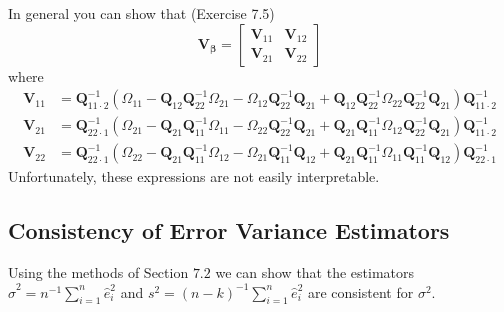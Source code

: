 \documentclass[10pt]{article}
\begin{document}
In general you can show that (Exercise 7.5)
$$
\boldsymbol{V}_{\boldsymbol{\beta}}=\left[\begin{array}{ll}
\boldsymbol{V}_{11} & \boldsymbol{V}_{12} \\
\boldsymbol{V}_{21} & \boldsymbol{V}_{22}
\end{array}\right]
$$
where
$$
\begin{aligned}
\boldsymbol{V}_{11} &=\boldsymbol{Q}_{11 \cdot 2}^{-1}\left(\Omega_{11}-\boldsymbol{Q}_{12} \boldsymbol{Q}_{22}^{-1} \Omega_{21}-\Omega_{12} \boldsymbol{Q}_{22}^{-1} \boldsymbol{Q}_{21}+\boldsymbol{Q}_{12} \boldsymbol{Q}_{22}^{-1} \Omega_{22} \boldsymbol{Q}_{22}^{-1} \boldsymbol{Q}_{21}\right) \boldsymbol{Q}_{11 \cdot 2}^{-1} \\
\boldsymbol{V}_{21} &=\boldsymbol{Q}_{22 \cdot 1}^{-1}\left(\Omega_{21}-\boldsymbol{Q}_{21} \boldsymbol{Q}_{11}^{-1} \Omega_{11}-\Omega_{22} \boldsymbol{Q}_{22}^{-1} \boldsymbol{Q}_{21}+\boldsymbol{Q}_{21} \boldsymbol{Q}_{11}^{-1} \Omega_{12} \boldsymbol{Q}_{22}^{-1} \boldsymbol{Q}_{21}\right) \boldsymbol{Q}_{11 \cdot 2}^{-1} \\
\boldsymbol{V}_{22} &=\boldsymbol{Q}_{22 \cdot 1}^{-1}\left(\Omega_{22}-\boldsymbol{Q}_{21} \boldsymbol{Q}_{11}^{-1} \Omega_{12}-\Omega_{21} \boldsymbol{Q}_{11}^{-1} \boldsymbol{Q}_{12}+\boldsymbol{Q}_{21} \boldsymbol{Q}_{11}^{-1} \Omega_{11} \boldsymbol{Q}_{11}^{-1} \boldsymbol{Q}_{12}\right) \boldsymbol{Q}_{22 \cdot 1}^{-1}
\end{aligned}
$$
Unfortunately, these expressions are not easily interpretable.

\subsection{Consistency of Error Variance Estimators}
Using the methods of Section $7.2$ we can show that the estimators $\widehat{\sigma}^{2}=n^{-1} \sum_{i=1}^{n} \widehat{e}_{i}^{2}$ and $s^{2}=(n-k)^{-1} \sum_{i=1}^{n} \widehat{e}_{i}^{2}$ are consistent for $\sigma^{2}$.
\end{document}
